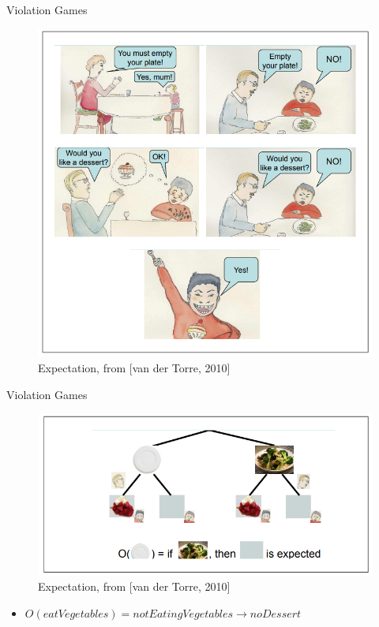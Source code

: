 \documentclass[10pt]{beamer}
\begin{document}
\begin{frame}[fragile]{Violation Games}
\begin{figure}[!htb]
    \centering
    \includegraphics[scale=0.7]{1.png}
    \caption{Expectation, from [van der Torre, 2010]}
    \label{fig:my_label}
\end{figure}
\end{frame}

\begin{frame}[fragile]{Violation Games}
\begin{figure}[!htb]
    \centering
    \includegraphics[scale=0.8]{2.png}
    \caption{Expectation, from [van der Torre, 2010]}
    \label{fig:my_label}
\end{figure}
\begin{itemize}
    \item $O(eatVegetables) = notEatingVegetables \to noDessert$
\end{itemize}
\end{frame}
\end{document}
